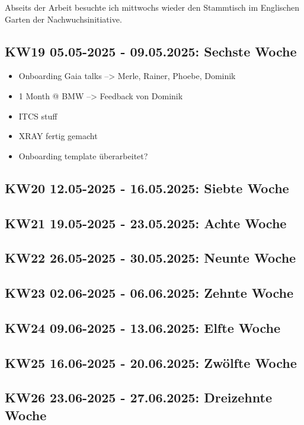 Abseits der Arbeit besuchte ich mittwochs wieder den Stammtisch im Englischen Garten der Nachwuchsinitiative.


\subsection{KW19 05.05-2025 - 09.05.2025: Sechste Woche}
\begin{itemize}
  \item Onboarding Gaia talks --> Merle, Rainer, Phoebe, Dominik
  \item 1 Month @ BMW --> Feedback von Dominik
  \item ITCS stuff
  \item XRAY fertig gemacht
  \item Onboarding template überarbeitet?
\end{itemize}



\subsection{KW20 12.05-2025 - 16.05.2025: Siebte Woche}


\subsection{KW21 19.05-2025 - 23.05.2025: Achte Woche}


\subsection{KW22 26.05-2025 - 30.05.2025: Neunte Woche}


\subsection{KW23 02.06-2025 - 06.06.2025: Zehnte Woche}


\subsection{KW24 09.06-2025 - 13.06.2025: Elfte Woche}


\subsection{KW25 16.06-2025 - 20.06.2025: Zwölfte Woche}


\subsection{KW26 23.06-2025 - 27.06.2025: Dreizehnte Woche}


